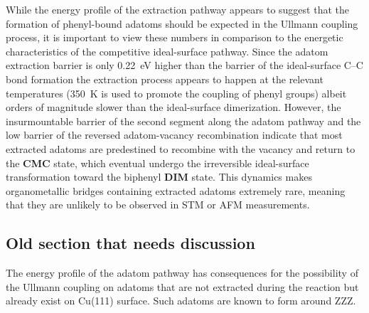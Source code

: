 \documentclass[%
 reprint,
 amsmath,amssymb,
 aps,
prb,
floatfix,
]{revtex4-2}
\newcommand{\lock}{\color{red}}
\newcommand{\lock}{\color{red}}
\begin{document}



{\lock
While the energy profile of the extraction pathway appears to suggest that the formation of phenyl-bound adatoms should be expected in the Ullmann coupling process, it is important to view these numbers in comparison to the energetic characteristics of the competitive ideal-surface pathway. Since the adatom extraction barrier is only \SI{0.22}{\electronvolt} higher than the barrier of the ideal-surface C--C bond formation the extraction process appears to happen at the relevant temperatures (\SI{350}{\kelvin} is used to promote the coupling of phenyl groups) albeit orders of magnitude slower than the ideal-surface dimerization. However, the insurmountable barrier of the second segment along the adatom pathway and the low barrier of the reversed adatom-vacancy recombination  indicate that most extracted adatoms are predestined to recombine with the vacancy and return to the \textbf{CMC} state, which eventual undergo the irreversible ideal-surface transformation toward the biphenyl \textbf{DIM} state. This dynamics makes organometallic bridges containing extracted adatoms extremely rare, meaning that they are unlikely to be observed in STM or AFM measurements.

}

\ifdefined\INTERNAL
\subsection{Old section that needs discussion}

{\lock

The energy profile of the adatom pathway has consequences for the possibility of the Ullmann coupling on adatoms that are not extracted during the reaction but already exist on Cu(111) surface. Such adatoms are known to form around ZZZ.

}
\end{document}
